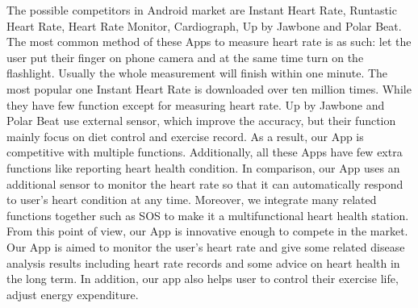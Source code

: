 
The possible competitors in Android market are Instant Heart Rate, Runtastic Heart Rate, Heart Rate Monitor, Cardiograph, Up by Jawbone and Polar Beat. The most common method of these Apps to measure heart rate is as such: let the user put their finger on phone camera and at the same time turn on the flashlight. Usually the whole measurement will finish within one minute. The most popular one Instant Heart Rate is downloaded over ten million times. While they have few function except for measuring heart rate. Up by Jawbone and Polar Beat use external sensor, which improve the accuracy, but their function mainly focus on diet control and exercise record. As a result, our App is competitive with multiple functions. Additionally, all these Apps have few extra functions like reporting heart health condition. In comparison, our App uses an additional sensor to monitor the heart rate so that it can automatically respond to user's heart condition at any time. Moreover, we integrate many related functions together such as SOS to make it a multifunctional heart health station. From this point of view, our App is innovative enough to compete in the market. Our App is aimed to monitor the user's heart rate and give some related disease analysis results including heart rate records and some advice on heart health in the long term. In addition, our app also helps user to control their exercise life, adjust energy expenditure. 
